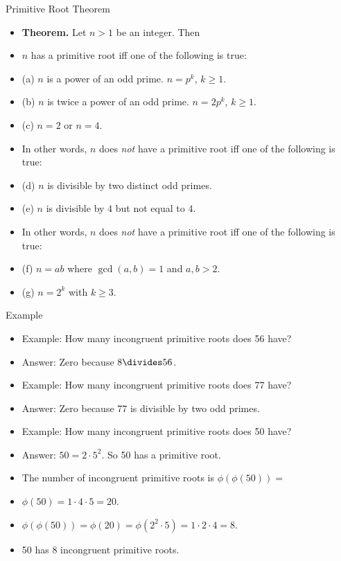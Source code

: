 \documentclass[handout]{beamer}
\begin{document}
\begin{frame}{Primitive Root Theorem}

\begin{itemize}
  \item \textbf{Theorem.} Let $n>1$ be an integer. Then
  \item $n$ has a primitive root iff one of the following is true:
  \item (a) $n$ is a power of an odd prime. $n=p^k$, $k\geq 1$.
  \item (b) $n$ is twice a power of an odd prime. $n=2p^k$, $k\geq 1$.
  \item (c) $n=2$ or $n=4$.
  \item In other words, $n$ does \emph{not} have a primitive root iff one of the following is true:
  \item (d) $n$ is divisible by two distinct odd primes.
  \item (e) $n$ is divisible by $4$ but not equal to $4$.
  \item In other words, $n$ does \emph{not} have a primitive root iff one of the following is true:
  \item (f) $n=ab$ where $\gcd(a,b)=1$ and $a,b>2$.
  \item (g) $n=2^k$ with $k\geq 3$.
\end{itemize}

\end{frame}

\begin{frame}{Example}

\begin{itemize}
  \item Example: How many incongruent primitive roots does 56 have?
  \item Answer: Zero because $8\divides 56$.
  \item Example: How many incongruent primitive roots does 77 have?
  \item Answer: Zero because 77 is divisible by two odd primes.
  \item Example: How many incongruent primitive roots does 50 have?
  \item Answer: $50=2\cdot 5^2$. So 50 has a primitive root.
  \item The number of incongruent primitive roots is $\phi(\phi(50))=$
  \item $\phi(50)= 1\cdot4\cdot 5 = 20$.
  \item $\phi(\phi(50))=\phi(20)=\phi(2^2\cdot 5)=1\cdot 2\cdot 4 = 8$.
  \item 50 has 8 incongruent primitive roots.
\end{itemize}

\end{frame}
\end{document}
